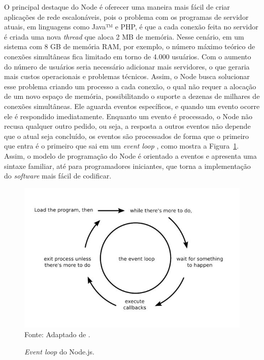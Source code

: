    O principal destaque do Node é oferecer uma maneira mais fácil de criar aplicações de rede escalonáveis, pois o problema com os programas de servidor atuais, em linguagens como Java™ e PHP, é que a cada conexão feita no servidor é criada uma nova \textit{thread} que aloca 2 MB de memória. Nesse cenário, em um sistema com 8 GB de memória RAM, por exemplo, o número máximo teórico de conexões simultâneas fica limitado em torno de 4.000 usuários. Com o aumento do número de usuários seria necessário adicionar mais servidores, o que geraria mais custos operacionais e problemas técnicos. Assim, o Node busca solucionar esse problema criando um processo a cada conexão, o qual não requer a alocação de um novo espaço de memória, possibilitando o suporte a dezenas de milhares de conexões simultâneas. Ele aguarda eventos específicos, e quando um evento ocorre ele é respondido imediatamente. Enquanto um evento é processado, o Node não recusa qualquer outro pedido, ou seja, a resposta a outros eventos não depende que o atual seja concluído, os eventos são processados de forma que o primeiro que entra é o primeiro que sai em um \textit{event loop} \cite{nodejs, nodejs3}, como mostra a Figura~\ref{nodejs:eventloop}.  Assim, o modelo de programação do Node é orientado a eventos e apresenta uma sintaxe familiar, até para programadores iniciantes, que torna a implementação do \textit{software} mais fácil de codificar.
 
  \begin{figure}[!t]
  \begin{center}
  \caption{\textit{Event loop} do Node.js.}
  \includegraphics[scale=0.7]{figuras/cap2/nodejs_loop.jpg}\\
  Fonte: Adaptado de \cite{nodejs2}.
  \label{nodejs:eventloop}
  \end{center}
  \end{figure}
 
